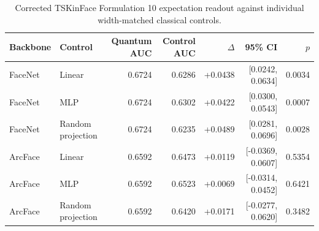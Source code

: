 \begin{table}[!t]
\centering
\caption{Corrected TSKinFace Formulation 10 expectation readout against individual width-matched classical controls.}
\label{tab:tskinface_width_controls}
\small
\begin{tabular}{llrrrrr}
\toprule
Backbone & Control & Quantum AUC & Control AUC & \(\Delta\) & 95\% CI & \(p\) \\
\midrule
FaceNet & Linear & 0.6724 & 0.6286 & +0.0438 & [0.0242, 0.0634] & 0.0034 \\
FaceNet & MLP & 0.6724 & 0.6302 & +0.0422 & [0.0300, 0.0543] & 0.0007 \\
FaceNet & Random projection & 0.6724 & 0.6235 & +0.0489 & [0.0281, 0.0696] & 0.0028 \\
\midrule
ArcFace & Linear & 0.6592 & 0.6473 & +0.0119 & [-0.0369, 0.0607] & 0.5354 \\
ArcFace & MLP & 0.6592 & 0.6523 & +0.0069 & [-0.0314, 0.0452] & 0.6421 \\
ArcFace & Random projection & 0.6592 & 0.6420 & +0.0171 & [-0.0277, 0.0620] & 0.3482 \\
\bottomrule
\end{tabular}
\end{table}
